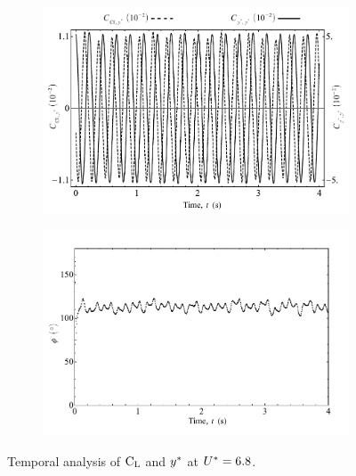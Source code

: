 \documentclass[oneside]{utmthesis}
\begin{document}
\begin{figure}
  \centering
  \begin{subfigure}[h]{1\textwidth}
    \includegraphics[width=\textwidth]{figs/tempAnalysisUpper-a}
    \caption{}
    \label{fig:tempAnalysisUpper-a}
  \end{subfigure}

  \begin{subfigure}[h]{1\textwidth}
    \includegraphics[width=\textwidth]{figs/tempAnalysisUpper-b}
    \caption{}
    \label{fig:tempAnalysisUpper-b}
  \end{subfigure}
  \caption{Temporal analysis of $\text{C}_{\text{L}}$ and $y^{*}$ at $U^{*} = 6.8$.}
\end{figure}
\end{document}
